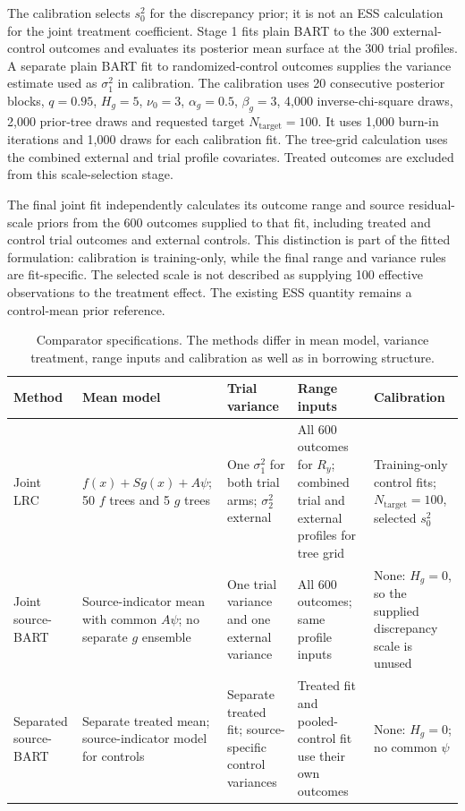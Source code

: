The calibration selects $s_0^2$ for the discrepancy prior; it is not an ESS calculation for the joint treatment coefficient. Stage 1 fits plain BART to the 300 external-control outcomes and evaluates its posterior mean surface at the 300 trial profiles. A separate plain BART fit to randomized-control outcomes supplies the variance estimate used as $\sigma_1^2$ in calibration. The calibration uses 20 consecutive posterior blocks, $q=0.95$, $H_g=5$, $\nu_0=3$, $\alpha_g=0.5$, $\beta_g=3$, 4,000 inverse-chi-square draws, 2,000 prior-tree draws and requested target $N_{\mathrm{target}}=100$. It uses 1,000 burn-in iterations and 1,000 draws for each calibration fit. The tree-grid calculation uses the combined external and trial profile covariates. Treated outcomes are excluded from this scale-selection stage.

The final joint fit independently calculates its outcome range and source residual-scale priors from the 600 outcomes supplied to that fit, including treated and control trial outcomes and external controls. This distinction is part of the fitted formulation: calibration is training-only, while the final range and variance rules are fit-specific. The selected scale is not described as supplying 100 effective observations to the treatment effect. The existing ESS quantity remains a control-mean prior reference.

\begin{table}[p]
\centering
\scriptsize
\setlength{\tabcolsep}{2pt}
\caption{Comparator specifications. The methods differ in mean model, variance treatment, range inputs and calibration as well as in borrowing structure.}
\label{tab:joint_comparators}
\begin{tabular}{@{}p{0.80in}p{1.35in}p{1.20in}p{1.20in}p{1.10in}@{}}
\toprule
Method & Mean model & Trial variance & Range inputs & Calibration \\
\midrule
Joint LRC & $f(x)+Sg(x)+A\psi$; 50 $f$ trees and 5 $g$ trees & One $\sigma_1^2$ for both trial arms; $\sigma_2^2$ external & All 600 outcomes for $R_y$; combined trial and external profiles for tree grid & Training-only control fits; $N_{\mathrm{target}}=100$, selected $s_0^2$ \\
Joint source-BART & Source-indicator mean with common $A\psi$; no separate $g$ ensemble & One trial variance and one external variance & All 600 outcomes; same profile inputs & None: $H_g=0$, so the supplied discrepancy scale is unused \\
Separated source-BART & Separate treated mean; source-indicator model for controls & Separate treated fit; source-specific control variances & Treated fit and pooled-control fit use their own outcomes & None: $H_g=0$; no common $\psi$ \\
\bottomrule
\end{tabular}
\end{table}


